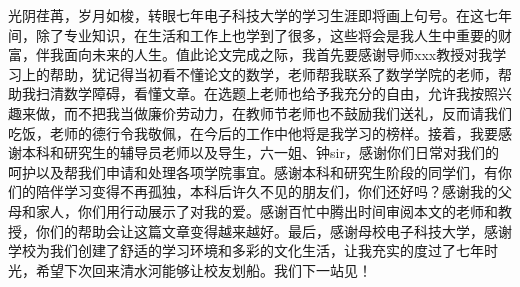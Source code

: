 
\thesisacknowledgement
光阴荏苒，岁月如梭，转眼七年电子科技大学的学习生涯即将画上句号。在这七年间，除了专业知识，在生活和工作上也学到了很多，这些将会是我人生中重要的财富，伴我面向未来的人生。值此论文完成之际，我首先要感谢导师xxx教授对我学习上的帮助，犹记得当初看不懂论文的数学，老师帮我联系了数学学院的老师，帮助我扫清数学障碍，看懂文章。在选题上老师也给予我充分的自由，允许我按照兴趣来做，而不把我当做廉价劳动力，在教师节老师也不鼓励我们送礼，反而请我们吃饭，老师的德行令我敬佩，在今后的工作中他将是我学习的榜样。接着，我要感谢本科和研究生的辅导员老师以及导生，六一姐、钟sir，感谢你们日常对我们的呵护以及帮我们申请和处理各项学院事宜。感谢本科和研究生阶段的同学们，有你们的陪伴学习变得不再孤独，本科后许久不见的朋友们，你们还好吗？感谢我的父母和家人，你们用行动展示了对我的爱。感谢百忙中腾出时间审阅本文的老师和教授，你们的帮助会让这篇文章变得越来越好。最后，感谢母校电子科技大学，感谢学校为我们创建了舒适的学习环境和多彩的文化生活，让我充实的度过了七年时光，希望下次回来清水河能够让校友划船。我们下一站见！

